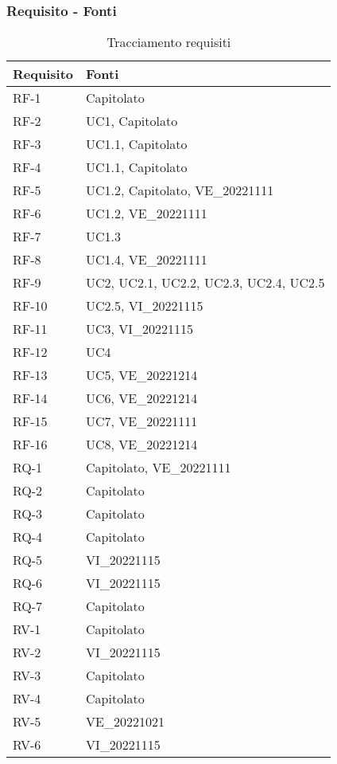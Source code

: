 \subsubsection{Requisito - Fonti}
\begin{table}[H]
	\centering
	\begin{tabular}{| p{} | p{} |} 
		\hline
		\textbf{Requisito} & \textbf{Fonti} \\
		\hline
		RF-1 & Capitolato\\
		\hline
		RF-2 & UC1, Capitolato\\
		\hline
		RF-3 & UC1.1, Capitolato\\
		\hline
		RF-4 & UC1.1, Capitolato\\
		\hline
		RF-5 & UC1.2, Capitolato, VE\_20221111\\
		\hline
		RF-6 & UC1.2, VE\_20221111\\
		\hline
		RF-7 & UC1.3\\
		\hline
		RF-8 & UC1.4, VE\_20221111\\
		\hline
		RF-9 & UC2, UC2.1, UC2.2, UC2.3, UC2.4, UC2.5\\
		\hline
		RF-10 & UC2.5, VI\_20221115\\
         \hline
		RF-11 & UC3, VI\_20221115\\
        \hline
		RF-12 & UC4\\
         \hline
		RF-13 & UC5, VE\_20221214\\
        \hline
		RF-14 & UC6, VE\_20221214\\
         \hline
		RF-15 & UC7, VE\_20221111\\
         \hline
		RF-16 & UC8, VE\_20221214\\
		\hline
		RQ-1 & Capitolato, VE\_20221111\\
		\hline
		RQ-2 & Capitolato\\
		\hline
		RQ-3 & Capitolato\\
		\hline
		RQ-4 & Capitolato\\
		\hline
		RQ-5 & VI\_20221115\\
		\hline
		RQ-6 & VI\_20221115\\
		\hline
		RQ-7 & Capitolato\\
		\hline
		RV-1 & Capitolato\\
		\hline
		RV-2 & VI\_20221115\\
		\hline
		RV-3 & Capitolato\\
		\hline
		RV-4 & Capitolato\\
		\hline
		RV-5 & VE\_20221021\\
		\hline
		RV-6 & VI\_20221115\\
		\hline
	\end{tabular}
	\caption{Tracciamento requisiti}
\end{table}

